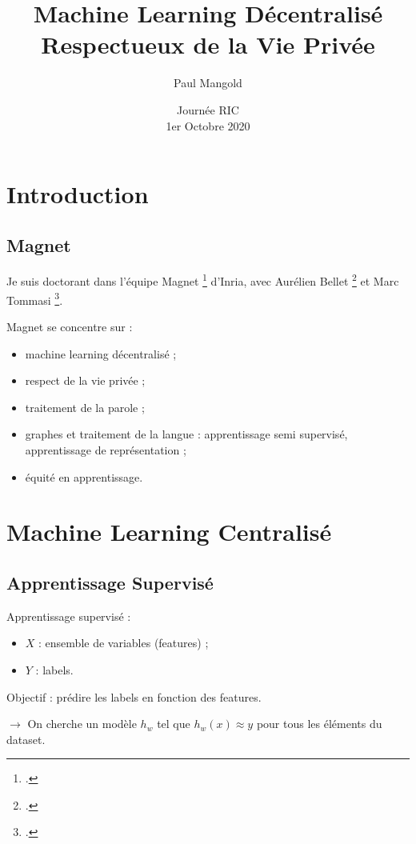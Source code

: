 \documentclass[notheorems]{beamer}
\title{Machine Learning Décentralisé Respectueux de la Vie Privée}
\author{Paul Mangold}
\date{Journée RIC \\[1em]
  1er Octobre 2020}
\begin{document}

\begin{notitle}
  \begin{frame}
    \titlepage
  \end{frame}
  \addtocounter{framenumber}{-1}
\end{notitle}

\section{Introduction}
\subsection{Magnet}
\begin{frame}
  Je suis doctorant dans l'équipe Magnet \footcite{magnet} d'Inria, avec Aurélien Bellet \footcite{abellet} et Marc Tommasi \footcite{mtommasi}.

  \vspace{1em}

  Magnet se concentre sur :
  \begin{itemize}
  \item machine learning décentralisé ;
  \item respect de la vie privée ;
  \item traitement de la parole ;
  \item graphes et traitement de la langue : apprentissage semi supervisé, apprentissage de représentation ;
  \item équité en apprentissage.
  \end{itemize}
\end{frame}

\section{Machine Learning Centralisé}

\subsection{Apprentissage Supervisé}
\begin{frame}
  Apprentissage supervisé :
  \begin{itemize}
  \item $X$ : ensemble de variables (features) ;
  \item $Y$ : labels.
  \end{itemize}

  Objectif : prédire les labels en fonction des features.

  \vspace{0.5em}

  $\longrightarrow$ On cherche un modèle $h_w$ tel que $h_w(x) \approx y$ pour tous les éléments du dataset.
\end{frame}
\end{document}
